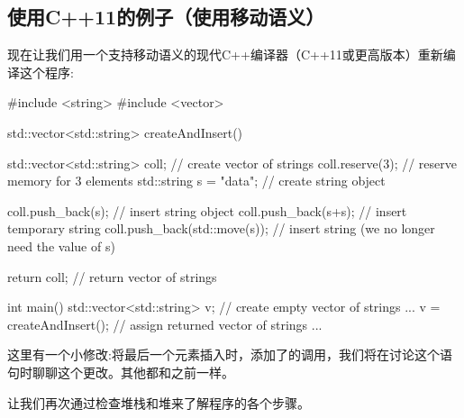 \subsection{使用C++11的例子（使用移动语义）}

现在让我们用一个支持移动语义的现代C++编译器（C++11或更高版本）重新编译这个程序:

\begin{cppcode}
#include <string>
#include <vector>

std::vector<std::string> createAndInsert()
{
	std::vector<std::string> coll; // create vector of strings
	coll.reserve(3); // reserve memory for 3 elements
	std::string s = "data"; // create string object

	coll.push_back(s); // insert string object
	coll.push_back(s+s); // insert temporary string
	coll.push_back(std::move(s)); // insert string (we no longer need the value of s)

	return coll; // return vector of strings
}

int main()
{
	std::vector<std::string> v; // create empty vector of strings
	...
	v = createAndInsert(); // assign returned vector of strings
	...
}
\end{cppcode}

这里有一个小修改:将最后一个元素插入时，添加了的调用，我们将在讨论这个语句时聊聊这个更改。其他都和之前一样。

让我们再次通过检查堆栈和堆来了解程序的各个步骤。

